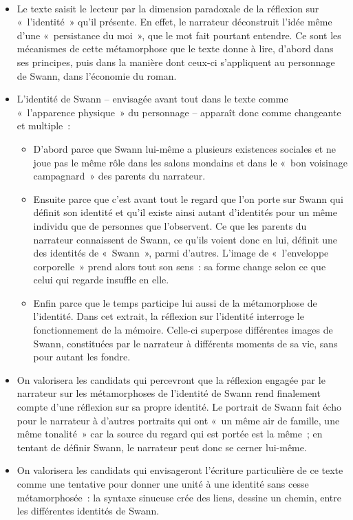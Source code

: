\vfill{~}\clearpage

{\begin{itemize}
\item Le texte saisit le lecteur par la dimension paradoxale de la réflexion sur
«~l'identité~» qu'il présente. En effet, le narrateur déconstruit l'idée même d'une
«~persistance du moi~», que le mot fait pourtant entendre. Ce sont les
mécanismes de cette métamorphose que le texte donne à lire, d'abord dans
ses principes, puis dans la manière dont ceux-ci s'appliquent au personnage de
Swann, dans l'économie du roman.
\item L'identité de Swann – envisagée avant tout dans le texte comme «~l'apparence
physique~» du personnage – apparaît donc comme changeante et multiple~:
\begin{itemize}[label=\textbullet]
\item D'abord parce que Swann lui-même a plusieurs existences sociales et ne
joue pas le même rôle dans les salons mondains et dans le «~bon voisinage
campagnard~» des parents du narrateur.
\item Ensuite parce que c'est avant tout le regard que l'on porte sur Swann qui
définit son identité et qu'il existe ainsi autant d'identités pour un même
individu que de personnes que l'observent. Ce que les parents du narrateur
connaissent de Swann, ce qu'ils voient donc en lui, définit une des identités
de «~Swann~», parmi d'autres. L'image de «~l'enveloppe corporelle~» prend
alors tout son sens~: sa forme change selon ce que celui qui regarde insuffle
en elle.
\item Enfin parce que le temps participe lui aussi de la métamorphose de l'identité.
Dans cet extrait, la réflexion sur l'identité interroge le fonctionnement de la
mémoire. Celle-ci superpose différentes images de Swann, constituées par
le narrateur à différents moments de sa vie, sans pour autant les fondre.
\end{itemize}
\item On valorisera les candidats qui percevront que la réflexion engagée par le
narrateur sur les métamorphoses de l'identité de Swann rend finalement
compte d'une réflexion sur sa propre identité. Le portrait de Swann fait écho
pour le narrateur à d'autres portraits qui ont «~un même air de famille, une même
tonalité~» car la source du regard qui est portée est la même~; en tentant de
définir Swann, le narrateur peut donc se cerner lui-même.
\item On valorisera les candidats qui envisageront l'écriture particulière de ce texte
comme une tentative pour donner une unité à une identité sans cesse
métamorphosée~: la syntaxe sinueuse crée des liens, dessine un chemin, entre
les différentes identités de Swann.
\end{itemize}}%

